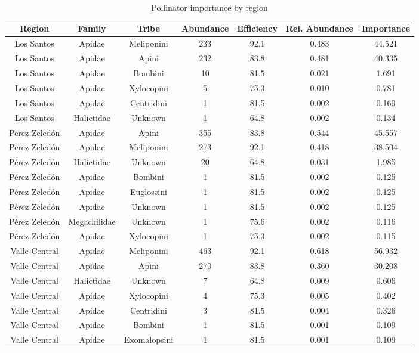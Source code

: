 \begin{table}[!h]
\centering
\caption{\label{tab:pollinator_importance}Pollinator importance by region}
\centering
\fontsize{8}{10}\selectfont
\begin{threeparttable}
\begin{tabular}[t]{ccccccc}
\hline\hline
Region & Family & Tribe & Abundance & Efficiency & Rel. Abundance & Importance\\
\midrule
Los Santos & Apidae & Meliponini & 233 & 92.1 & 0.483 & 44.521\\
Los Santos & Apidae & Apini & 232 & 83.8 & 0.481 & 40.335\\
Los Santos & Apidae & Bombini & 10 & 81.5 & 0.021 & 1.691\\
Los Santos & Apidae & Xylocopini & 5 & 75.3 & 0.010 & 0.781\\
Los Santos & Apidae & Centridini & 1 & 81.5 & 0.002 & 0.169\\
Los Santos & Halictidae & Unknown & 1 & 64.8 & 0.002 & 0.134\\
Pérez Zeledón & Apidae & Apini & 355 & 83.8 & 0.544 & 45.557\\
Pérez Zeledón & Apidae & Meliponini & 273 & 92.1 & 0.418 & 38.504\\
Pérez Zeledón & Halictidae & Unknown & 20 & 64.8 & 0.031 & 1.985\\
Pérez Zeledón & Apidae & Bombini & 1 & 81.5 & 0.002 & 0.125\\
Pérez Zeledón & Apidae & Euglossini & 1 & 81.5 & 0.002 & 0.125\\
Pérez Zeledón & Apidae & Unknown & 1 & 81.5 & 0.002 & 0.125\\
Pérez Zeledón & Megachilidae & Unknown & 1 & 75.6 & 0.002 & 0.116\\
Pérez Zeledón & Apidae & Xylocopini & 1 & 75.3 & 0.002 & 0.115\\
Valle Central & Apidae & Meliponini & 463 & 92.1 & 0.618 & 56.932\\
Valle Central & Apidae & Apini & 270 & 83.8 & 0.360 & 30.208\\
Valle Central & Halictidae & Unknown & 7 & 64.8 & 0.009 & 0.606\\
Valle Central & Apidae & Xylocopini & 4 & 75.3 & 0.005 & 0.402\\
Valle Central & Apidae & Centridini & 3 & 81.5 & 0.004 & 0.326\\
Valle Central & Apidae & Bombini & 1 & 81.5 & 0.001 & 0.109\\
Valle Central & Apidae & Exomalopsini & 1 & 81.5 & 0.001 & 0.109\\

\end{tabular}
\end{threeparttable}
\end{table}
